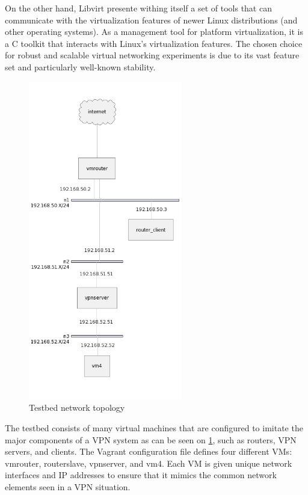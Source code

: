 \documentclass[12pt, fleqn, a4paper]{article}
\begin{document}
On the other hand, Libvirt presente withing itself a set of tools that can communicate with the virtualization features of newer Linux distributions (and other operating systems). As a management tool for platform virtualization, it is a C toolkit that interacts with Linux's virtualization features. The chosen choice for robust and scalable virtual networking experiments is due to its vast feature set and particularly well-known stability.

\begin{figure}[H]
	\centering
	\includegraphics[width=0.6\textwidth]{img/topology}
	\caption{Testbed network topology}
  \label{fig:topology}
\end{figure}

The testbed consists of many virtual machines that are configured to imitate the major components of a VPN system as can be seen on \cref{fig:topology}, such as routers, VPN servers, and clients. The Vagrant configuration file defines four different VMs: vmrouter, routerslave, vpnserver, and vm4. Each VM is given unique network interfaces and IP addresses to ensure that it mimics the common network elements seen in a VPN situation.
\end{document}
